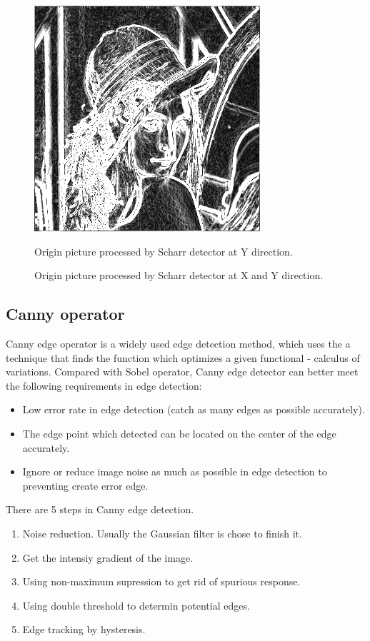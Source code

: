 \documentclass[10pt,twocolumn,letterpaper]{article}
\begin{document}
\begin{figure}[htp]
\begin{center}
		\includegraphics[width=.473\linewidth]{../../code/lenaScharr.png}	
		\caption{Origin picture processed by Scharr detector at Y direction. }
		\caption{Origin picture processed by Scharr detector at X and Y direction. }
		\label{fig:long}
	\end{center}
\end{figure}

\subsection{Canny operator}

Canny edge operator is a widely used edge detection method, which uses the a 
technique that finds the function which optimizes a given functional - calculus 
of variations.\cite{ref10} Compared with Sobel operator, Canny edge detector can better meet 
the following requirements in edge detection: 
\begin{itemize}[noitemsep]
\item Low error rate in edge detection (catch as many edges as possible accurately). 
\item The edge point which detected can be located on the center of the edge accurately. 
\item Ignore or reduce image noise as much as possible in edge detection to preventing 
create error edge. 
\end{itemize}

There are 5 steps in Canny edge detection. 
\begin{enumerate}[noitemsep]
\item Noise reduction. Usually the Gaussian filter is chose to finish it.
\item Get the intensiy gradient of the image. 
\item Using non-maximum supression to get rid of spurious response. 
\item Using double threshold to determin potential edges. 
\item Edge tracking by hysteresis. 
\end{enumerate}
\end{document}

